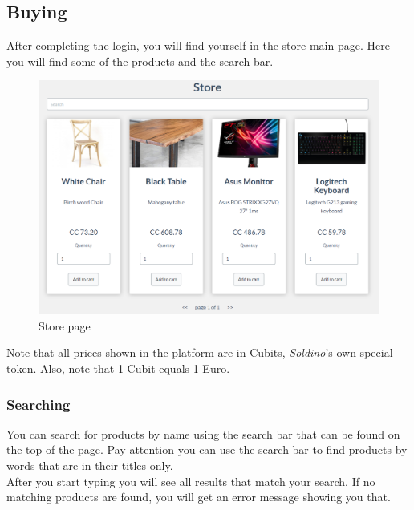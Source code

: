 	\subsection{Buying}
	After completing the login, you will find yourself in the store main page. 
	Here you will find some of the products and the search bar.
	\begin{figure}[H]
		\includegraphics[width=15cm]{res/images/store_main_page.png}
		\centering
		\caption{Store page}
	\end{figure}
	\noindent Note that all prices shown in the platform are in Cubits\glo{}, 
	\textit{Soldino}'s own special token. Also, note that 1 Cubit equals 1 Euro.
		\subsubsection{Searching}
		You can search for products by name using the search bar that can be 
		found on the top of the page. Pay attention you can use the search bar 
		to find products by words that are in their titles only. \\
		After you start typing you will see 
		all results that match your search. If no matching products are found, 
		you will get an error message showing you that.
%		
